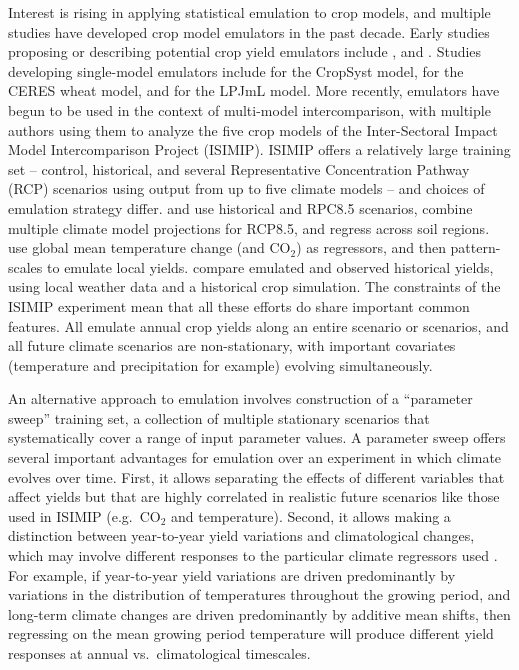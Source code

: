 \documentclass[gmdd]{copernicus} %
\begin{document}
Interest is rising in applying statistical emulation to crop models, and multiple studies have developed crop model emulators in the past decade.
Early studies proposing or describing potential crop yield emulators include \citet{Howden2005, raisen2006, Lobell2010}, and \citet{Ferrise2011}.
Studies developing single-model emulators include \citet{Holzkamper2012} for the CropSyst model, \citet{RUANE2013a} for the CERES wheat model, and \citet{Oyebamiji15} for the LPJmL model. 
More recently, emulators have begun to be used in the context of multi-model intercomparison, with multiple authors \citep{BLANC2015, BLANC2017, Ostberg2018, Mistry2017}  using them to analyze the five crop models  of the Inter-Sectoral Impact Model Intercomparison Project (ISIMIP). ISIMIP offers a relatively large training set --  control, historical, and several Representative Concentration Pathway (RCP) scenarios using output from up to five climate models \citep{Warszawski3228, Frieler2017} -- and choices of emulation strategy differ.
\citet{BLANC2015} and \citet{BLANC2017} use historical and RPC8.5 scenarios, combine multiple climate model projections for RCP8.5, and regress across soil regions. 
\citet{Ostberg2018} use global mean temperature change (and CO$_2$) as regressors, and then pattern-scales to emulate local yields. 
\citet{Mistry2017} compare emulated and observed historical yields, using local weather data and a historical crop simulation. 
The constraints of the ISIMIP experiment mean that all these efforts do share important common features. 
All emulate annual crop yields along an entire scenario or scenarios, and all future climate scenarios are non-stationary, with important covariates (temperature and precipitation for example) evolving simultaneously. 

An alternative approach to emulation involves construction of a ``parameter sweep'' training set, a collection of multiple stationary scenarios that systematically cover a range of input parameter values.
A parameter sweep offers several important advantages for emulation over an experiment in which climate evolves over time. 
First, it allows separating the effects of different variables that affect yields but that are highly correlated in realistic future scenarios like those used in ISIMIP (e.g.\ CO$_2$ and temperature). 
Second, it allows making a distinction between year-to-year yield variations and climatological changes, which may involve different responses to the particular climate regressors used \citep[e.g.][]{Ruane2016}. 
For example, if year-to-year yield variations are driven predominantly by variations in the distribution of temperatures throughout the growing period, and long-term climate changes are driven predominantly by additive mean shifts, then regressing on the mean growing period temperature will produce different yield responses at annual vs.\ climatological timescales.  
\end{document}
